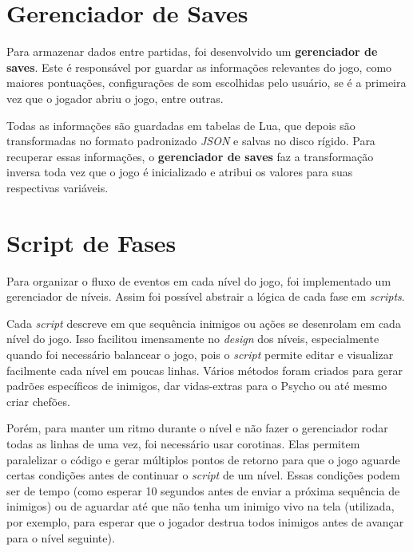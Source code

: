\section{Gerenciador de Saves}
\label{sec:gerenciador_de_saves}

Para armazenar dados entre partidas, foi desenvolvido um \textbf{gerenciador de saves}. Este é responsável por guardar as informações relevantes do jogo, como maiores pontuações, configurações de som escolhidas pelo usuário, se é a primeira vez que o jogador abriu o jogo, entre outras.

Todas as informações são guardadas em tabelas de Lua, que depois são transformadas no formato padronizado \textit{JSON} e salvas no disco rígido. Para recuperar essas informações, o \textbf{gerenciador de saves} faz a transformação inversa toda vez que o jogo é inicializado e atribui os valores para suas respectivas variáveis.

\section{Script de Fases}
\label{sec:level_script}

Para organizar o fluxo de eventos em cada nível do jogo, foi implementado um gerenciador de níveis. Assim foi possível abstrair a lógica de cada fase em \textit{scripts}.

Cada \textit{script} descreve em que sequência inimigos ou ações se desenrolam em cada nível do jogo. Isso facilitou imensamente no \textit{design} dos níveis, especialmente quando foi necessário balancear o jogo, pois o \textit{script} permite editar e visualizar facilmente cada nível em poucas linhas. Vários métodos foram criados para gerar padrões específicos de inimigos, dar vidas-extras para o Psycho ou até mesmo criar chefões.

Porém, para manter um ritmo durante o nível e não fazer o gerenciador rodar todas as linhas de uma vez, foi necessário usar corotinas. Elas permitem paralelizar o código e gerar múltiplos pontos de retorno para que o jogo aguarde certas condições antes de continuar o \textit{script} de um nível. Essas condições podem ser de tempo (como esperar 10 segundos antes de enviar a próxima sequência de inimigos) ou de aguardar até que não tenha um inimigo vivo na tela (utilizada, por exemplo, para esperar que o jogador destrua todos inimigos antes de avançar para o nível seguinte).


